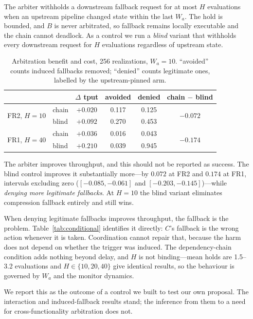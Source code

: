 The arbiter withholds a downstream fallback request for at most $H$
evaluations when an upstream pipeline changed state within the last $W_a$.
The hold is bounded, and $B$ is never arbitrated, so fallback remains
locally executable and the chain cannot deadlock. As a control we run a
\emph{blind} variant that withholds every downstream request for $H$
evaluations regardless of upstream state.

\begin{table}[t]
\caption{Arbitration benefit and cost, 256 realizations, $W_a{=}10$.
``avoided'' counts induced fallbacks removed; ``denied'' counts legitimate
ones, labelled by the upstream-pinned arm.}
\label{tab:arbiter}
\centering
\begin{tabular}{llcccc}
\toprule
 & & $\Delta$ tput & avoided & denied & chain $-$ blind \\
\midrule
\multirow{2}{*}{FR2, $H{=}10$}
 & chain & $+0.020$ & 0.117 & 0.125 & \multirow{2}{*}{$-0.072$} \\
 & blind & $+0.092$ & 0.270 & 0.453 & \\
\midrule
\multirow{2}{*}{FR1, $H{=}40$}
 & chain & $+0.036$ & 0.016 & 0.043 & \multirow{2}{*}{$-0.174$} \\
 & blind & $+0.210$ & 0.039 & 0.945 & \\
\bottomrule
\end{tabular}
\end{table}

The arbiter improves throughput, and this should not be reported as
success. The blind control improves it substantially more---by
$0.072$ at FR2 and $0.174$ at FR1, intervals excluding zero
($[-0.085,-0.061]$ and $[-0.203,-0.145]$)---while \emph{denying more
legitimate fallbacks}. At $H{=}10$ the blind variant eliminates compression
fallback entirely and still wins.

When denying legitimate fallbacks improves throughput, the fallback is the
problem. Table~\ref{tab:conditional} identifies it directly: $C$'s fallback
is the wrong action whenever it is taken. Coordination cannot repair that,
because the harm does not depend on whether the trigger was induced. The
dependency-chain condition adds nothing beyond delay, and $H$ is not
binding---mean holds are 1.5--3.2 evaluations and $H\in\{10,20,40\}$ give
identical results, so the behaviour is governed by $W_a$ and the monitor
dynamics.

We report this as the outcome of a control we built to test our own
proposal. The interaction and induced-fallback results stand; the inference
from them to a need for cross-functionality arbitration does not.
